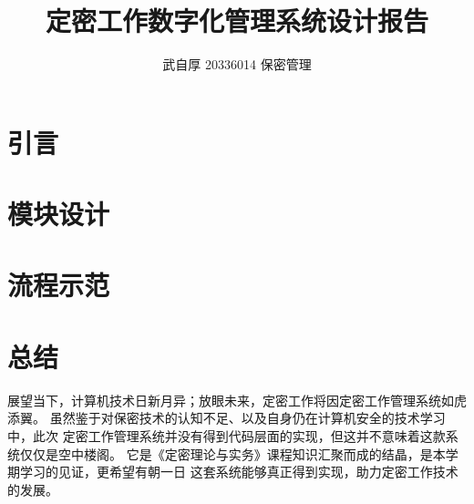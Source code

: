 \documentclass{mystyle}
\title{\textbf{定密工作数字化管理系统设计报告}}
\author{武自厚 \hspace{1em} 20336014 \hspace{1em} 保密管理}
\date{}
\begin{document}
    \maketitle

    \section{引言}  
    
    \section{模块设计}
    
    \section{流程示范}
    
    \section{总结}
    展望当下，计算机技术日新月异；放眼未来，定密工作将因定密工作管理系统如虎添翼。
    虽然鉴于对保密技术的认知不足、以及自身仍在计算机安全的技术学习中，此次
    定密工作管理系统并没有得到代码层面的实现，但这并不意味着这款系统仅仅是空中楼阁。
    它是《定密理论与实务》课程知识汇聚而成的结晶，是本学期学习的见证，更希望有朝一日
    这套系统能够真正得到实现，助力定密工作技术的发展。
    
\end{document}
